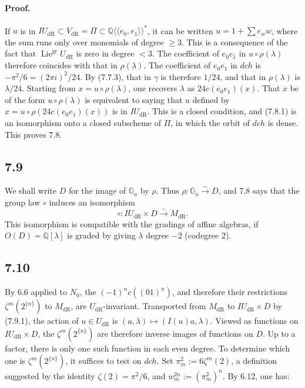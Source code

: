 \documentclass[11pt]{article}
\newcommand{\Q}{\mathbb Q}
\newcommand{\Ga}{\mathbb G_a}
\newcommand{\Lie}{\operatorname{Lie}}
\newcommand{\dR}{\mathrm{dR}}
\begin{document}
\paragraph{Proof.}
If $u$ is in $IU_{\dR}\subset V_{\dR}=\Pi\subset\Q\langle\!\langle e_0,e_1\rangle\!\rangle^*$, it can be written $u=1+\sum e_w w$, where the sum runs only over monomials of degree $\geq3$.
This is a consequence of the fact that $\Lie^{\mathrm{gr}}U_{\dR}$ is zero in degree $<3$.
The coefficient of $e_0e_1$ in $u\circ\rho(\lambda)$ therefore coincides with that in $\rho(\lambda)$.
The coefficient of $e_0e_1$ in $dch$ is $-\pi^2/6=(2\pi i)^2/24$.
By (7.7.3), that in $\gamma$ is therefore $1/24$, and that in $\rho(\lambda)$ is $\lambda/24$.
Starting from $x=u\circ\rho(\lambda)$, one recovers $\lambda$ as $24c(e_0e_1)(x)$.
That $x$ be of the form $u\circ\rho(\lambda)$ is equivalent to saying that $u$ defined by $x=u\circ\rho(24c(e_0e_1)(x))$ is in $IU_{\dR}$.
This is a closed condition, and (7.8.1) is an isomorphism onto a closed subscheme of $\Pi$, in which the orbit of $dch$ is dense.
This proves 7.8.

\subsection*{7.9}
We shall write $D$ for the image of $\Ga$ by $\rho$.
Thus $\rho:\Ga\xrightarrow{\sim}D$, and 7.8 says that the group law $\circ$ induces an isomorphism
\begin{equation}
 \circ:IU_{\dR}\times D\xrightarrow{\sim}M_{\dR}.
\tag{7.9.1}
\end{equation}
This isomorphism is compatible with the gradings of affine algebras, if $O(D)=\Q[\lambda]$ is graded by giving $\lambda$ degree $-2$ (codegree $2$).

\subsection*{7.10}
By 6.6 applied to $N_0$, the $(-1)^n c((01)^n)$, and therefore their restrictions $\zeta^m(2^{\{n\}})$ to $M_{\dR}$, are $U_{\dR}$-invariant.
Transported from $M_{\dR}$ to $IU_{\dR}\times D$ by (7.9.1), the action of $u\in U_{\dR}$ is $(a,\lambda)\mapsto(I(u)a,\lambda)$.
Viewed as functions on $IU_{\dR}\times D$, the $\zeta^m(2^{\{n\}})$ are therefore inverse images of functions on $D$.
Up to a factor, there is only one such function in each even degree.
To determine which one is $\zeta^m(2^{\{n\}})$, it suffices to test on $dch$.
Set $\pi_m^2:=6\zeta^m(2)$, a definition suggested by the identity $\zeta(2)=\pi^2/6$, and $w_m^{2n}:=(\pi_m^2)^n$.
By 6.12, one has:
\end{document}
